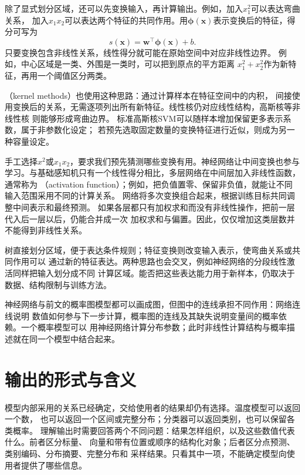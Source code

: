除了显式划分区域，还可以先变换输入，再计算输出。例如，加入$x_1^2$可以表达弯曲关系，
加入$x_1x_2$可以表达两个特征的共同作用。用$\bm{\phi}(\bm{x})$表示变换后的特征，得分可写为
\begin{equation}
  s(\bm{x})=\bm{w}^{\top}\bm{\phi}(\bm{x})+b.
  \label{eq:models-feature-score}
\end{equation}
只要变换包含非线性关系，线性得分就可能在原始空间中对应非线性边界。
例如，中心区域是一类、外围是一类时，可以把到原点的平方距离
$x_1^2+x_2^2$作为新特征，再用一个阈值区分两类。

（kernel methods）也使用这种思路：通过计算样本在特征空间中的内积，
间接使用变换后的关系，无需逐项列出所有新特征。线性核仍对应线性结构，高斯核等非线性核
则能够形成弯曲边界。
标准高斯核SVM可以随样本增加保留更多表示系数，属于非参数化设定；
若预先选取固定数量的变换特征进行近似，则成为另一种容量设定。

手工选择$x^2$或$x_1x_2$，要求我们预先猜测哪些变换有用。神经网络让中间变换也参与
学习。与基础感知机只有一个线性得分相比，多层网络在中间层加入非线性函数，通常称为
（activation function）；例如，把负值置零、保留非负值，就能让不同
输入范围采用不同的计算关系。
网络将多次变换组合起来，根据训练目标共同调整中间表示和最终预测。
如果各层都只有加权求和而没有非线性操作，把前一层代入后一层以后，仍能合并成一次
加权求和与偏置。因此，仅仅增加这类层数并不能得到非线性关系。

树直接划分区域，便于表达条件规则；特征变换则改变输入表示，使弯曲关系或共同作用可以
通过新的特征表达。两种思路也会交叉，例如神经网络的分段线性激活同样把输入划分成不同
计算区域。能否把这些表达能力用于新样本，仍取决于数据、结构限制与训练方法。

神经网络与前文的概率图模型都可以画成图，但图中的连线承担不同作用：网络连线说明
数值如何参与下一步计算，概率图的连线及其缺失说明变量间的概率依赖。一个概率模型可以
用神经网络计算分布参数；此时非线性计算结构与概率描述就在同一个模型中结合起来。

\FloatBarrier
\section{输出的形式与含义}
\label{sec:models-output}

模型内部采用的关系已经确定，交给使用者的结果却仍有选择。温度模型可以返回一个数，
也可以返回一个区间或完整分布；分类器可以返回类别，也可以保留各类概率。
理解输出时需要回答两个不同问题：结果怎样组织，以及这些数值代表什么。前者区分标量、
向量和带有位置或顺序的结构化对象；后者区分点预测、类别编码、分布摘要、完整分布和
采样结果。只看其中一项，不能确定模型向使用者提供了哪些信息。

